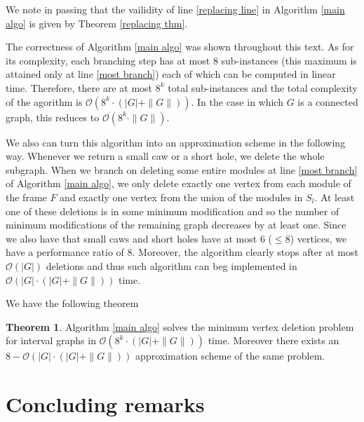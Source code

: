 \documentclass{article}
\theoremstyle{definition}
\newtheorem{thm}{Theorem}[section]
\begin{document}
    We note in passing that the vailidity of
    line \ref{replacing line} in
    Algorithm \ref{main algo}
    is given by Theorem \ref{replacing thm}.
    
    The correctness of Algorithm \ref{main algo}
    was shown throughout this text.
    As for its complexity, each
    branching step has at most
    $8$ sub-instances (this
    maximum is attained only
    at line \ref{most branch}) each
    of which can be computed
    in linear time. Therefore,
    there are at most $8^{k}$ 
    total sub-instances and 
    the total complexity of the agorithm
    is $\mathcal{O} \left(8^{k} \cdot \left(\left|G\right| + \|G\|\right)\right)$.
    In the case in which $G$ is 
    a connected graph, this reduces to
    $\mathcal{O} \left(8^{k} \cdot \|G\|\right)$.

    We also can turn this
    algorithm into an approximation
    scheme in the following way. 
    Whenever we return a small caw
    or a short hole, we delete the whole
    subgraph. When we branch on deleting
    some entire modules at line \ref{most branch}
    of Algorithm \ref{main algo},
    we only delete exactly one
    vertex from each module of
    the frame $F$ and exactly
    one vertex from the
    union of the modules in $S_{l}$.
    At least one of these
    deletions is in some
    minimum modification and
    so the number of minimum
    modifications of the
    remaining graph decreases
    by at least one.
    Since we also have
    that small caws and short
    holes have at most $6$ ($ \leq 8$)
    vertices, we have
    a performance ratio of $8$.
    Moreover, the algorithm clearly stops
    after at most $\mathcal{O} \left(\left|G\right|\right)$ 
    deletions and thus
    such algorithm can beg
    implemented in $\mathcal{O} \left(\left|G\right| \cdot \left(\left|G\right| + \|G\|\right)\right)$
    time.

    We have the following theorem

    \begin{thm}
        Algorithm \ref{main algo} solves
        the minimum vertex deletion
        problem for interval graphs
        in $\mathcal{O} \left(8^{k} \cdot \left(\left|G\right| + \|G\|\right)\right)$ time.
        Moreover there exists
        an $8-\mathcal{O} \left(\left|G\right| \cdot \left(\left|G\right| + \|G\|\right)\right)$
        approximation scheme of the 
        same problem.
    \end{thm}

    \section{Concluding remarks}
    
\end{document}
